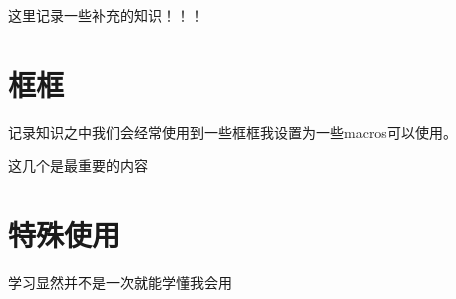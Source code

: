 这里记录一些补充的知识！！！

\section{框框}\label{sec:框框} %

记录知识之中我们会经常使用到一些框框我设置为一些macros可以使用。

这几个是最重要的内容

\section{特殊使用}\label{sec:special} %
学习显然并不是一次就能学懂我会用



